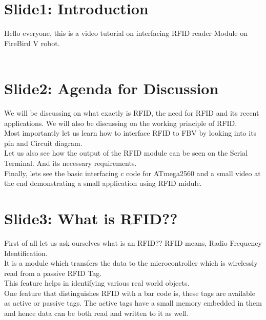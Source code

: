 \documentclass[a4paper,29.6pt]{article}
\begin{document}
\newpage
\section{Slide1: Introduction}
\begin{small}
Hello everyone, this is a video tutorial on interfacing RFID reader Module on FireBird V robot.\\\\

\end{small}

\section{Slide2: Agenda for Discussion}
\begin{small}

We will be discussing on what exactly is RFID, the need for RFID  and its recent applications.
We will also be discussing on the working principle of RFID.\\
Most importantly let us learn how to interface RFID to FBV by looking into its pin and Circuit diagram.\\
Let us also see how the output of the RFID module can be seen on the Serial Terminal. And its necessary requirements.\\
Finally, lets see the basic interfacing c code for ATmega2560 and a small video at the end demonstrating a small application using RFID midule.

\end{small}

\section{Slide3: What is RFID??}
\begin{small}
First of all let us ask ourselves what is an RFID??
RFID means, Radio Frequency  Identification.\\ It is a module which transfers the data to the microcontroller which is wirelessly read from a passive RFID Tag.\\
This feature helps in identifying various real world objects.\\
One feature that distinguishes RFID with a bar code is, these tags are available as active or passive tags. The active tags have a small memory embedded in them and hence data can be both read and written to it as well.

\end{small}
\end{document}
